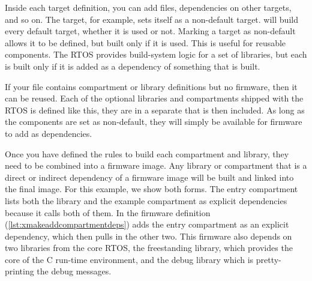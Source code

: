 Inside each target definition, you can add files, dependencies on other targets, and so on.
The  target, for example, sets itself as a non-default target.
 will build every default target, whether it is used or not.
Marking a target as non-default allows it to be defined, but built only if it is used.
This is useful for reusable components.
The RTOS provides build-system logic for a set of libraries, but each is built only if it is added as a dependency of something that is built.



\begin{note}
	If your  file contains compartment or library definitions but no firmware, then it can be reused.
	Each of the optional libraries and compartments shipped with the RTOS is defined like this, they are in a separate  that is then included.
	As long as the components are set as non-default, they will simply be available for firmware to add as dependencies.
\end{note}

Once you have defined the rules to build each compartment and library, they need to be combined into a firmware image.
Any library or compartment that is a direct or indirect dependency of a firmware image will be built and linked into the final image.
For this example, we show both forms.
The entry compartment lists both the library and the example compartment as explicit dependencies because it calls both of them.
In the firmware definition (\ref{lst:xmakeaddcompartmentdeps}) adds the entry compartment as an explicit dependency, which then pulls in the other two.
This firmware also depends on two libraries from the core RTOS, the freestanding library, which provides the core of the C run-time environment, and the debug library which is pretty-printing the debug messages.

